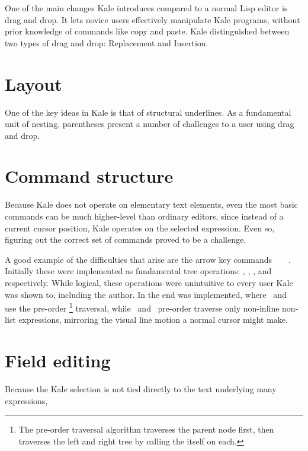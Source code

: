 One of the main changes Kale introduces compared to a normal Lisp editor is
drag and drop. It lets novice users effectively manipulate Kale programs,
without prior knowledge of commands like copy and paste. Kale distinguished
between two types of drag and drop: Replacement and Insertion. 

\section{Layout}

One of the key ideas in Kale is that of structural underlines. As a
fundamental unit of nesting, parentheses present a number of challenges to a
user using drag and drop.

\section{Command structure}

Because Kale does not operate on elementary text elements, even the most
basic
commands can be much higher-level than ordinary editors, since instead of a
current cursor position, Kale operates on the selected expression. Even so,
figuring out the correct set of commands proved to be a challenge.

A good example of the difficulties that arise are the arrow key
commands~\ak{^}~~\ak{<}~\ak{>}. Initially these were implemented as
fundamental tree operations: , ,
, and  respectively.
While logical, these operations were unintuitive to every user
Kale was shown to, including the author. In the end  was
implemented, where~\ak{<} and~\ak{>} use the pre-order%
%
\footnote{The pre-order traversal algorithm traverses the parent node first,
then traverses the left and right tree by calling the itself on each.}
%
traversal, while~\ak{^} and~
pre-order traverse only non-inline non-list expressions, mirroring the visual
line motion a normal cursor might make.

\section{Field editing}
Because the Kale selection is not tied directly to the text underlying many
expressions, 

